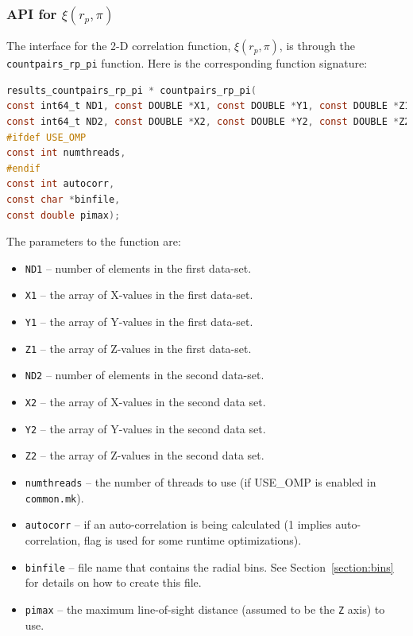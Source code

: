 \documentclass[12pt,titlepage,justified]{article}
\newcommand{\xirppi}{\ensuremath{{\xi(r_p,\pi)}}\xspace}
\begin{document}
\subsubsection{API for \texorpdfstring{\xirppi}{xi(rp,pi)}}
The interface for the 2-D correlation function, \xirppi, is through the \texttt{countpairs\_rp\_pi} function. Here is 
the corresponding function signature:
\begin{lstlisting}[language=C,numbers=none,label={code:API_DDrppi},basicstyle=\scriptsize,caption={API for the 2-D \xirppi}]
results_countpairs_rp_pi * countpairs_rp_pi(
const int64_t ND1, const DOUBLE *X1, const DOUBLE *Y1, const DOUBLE *Z1,
const int64_t ND2, const DOUBLE *X2, const DOUBLE *Y2, const DOUBLE *Z2,
#ifdef USE_OMP
const int numthreads,
#endif
const int autocorr,
const char *binfile,
const double pimax);
\end{lstlisting}

The parameters to the function are:
\begin{itemize}
\item \texttt{ND1} -- number of elements in the first data-set.
\item \texttt{X1}  -- the array of X-values in the first data-set.
\item \texttt{Y1}  -- the array of Y-values in the first data-set.
\item \texttt{Z1}  -- the array of Z-values in the first data-set.
\item \texttt{ND2} -- number of elements in the second data-set.
\item \texttt{X2}  -- the array of X-values in the second data set.
\item \texttt{Y2}  -- the array of Y-values in the second data set.
\item \texttt{Z2}  -- the array of Z-values in the second data set.
\item \texttt{numthreads} -- the number of threads to use (if USE\_OMP is enabled in \texttt{common.mk}).
\item \texttt{autocorr} -- if an auto-correlation is being calculated (1 implies auto-correlation, flag is used for some runtime optimizations).
\item \texttt{binfile} -- file name that contains the radial bins. See Section~\ref{section:bins} for details on how to create this file.
\item \texttt{pimax} -- the maximum line-of-sight distance (assumed to be the \texttt{Z} axis) to use. 
\end{itemize}
\end{document}
